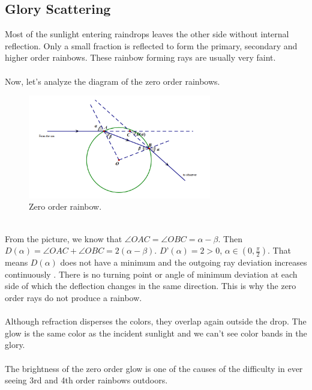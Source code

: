 \documentclass{article}
\begin{document}
\begin{spacing}{1.5}
\subsection{Glory Scattering}
Most of the sunlight entering raindrops leaves the other side without internal reflection. Only a small fraction is reflected to form the primary, secondary and higher order rainbows. These rainbow forming rays are usually very faint. \cite{Atoptics}\\
\\
Now, let’s analyze the diagram of the zero order rainbows.\\
\begin{figure}[!htb]
\centering
\includegraphics[width=8cm]{7.png}
\caption{Zero order rainbow.}
\end{figure}
\\
From the picture, we know that $\angle OAC=\angle OBC=\alpha-\beta$. Then $D(\alpha)= \angle OAC+\angle OBC=2(\alpha-\beta)$. $D’(\alpha)=2>0$, $\alpha\in(0,\frac{\pi}{2})$. That means $D(\alpha)$ does not have a minimum and the outgoing ray deviation increases continuously . There is no turning point or angle of minimum deviation at each side of which the deflection changes in the same direction. This is why the zero order rays do not produce a rainbow. \cite{Atoptics}\\
\\
Although refraction disperses the colors, they overlap again outside the drop. The glow is the same color as the incident sunlight and we can’t see color bands in the glory. \cite{Atoptics}\\
\\
The brightness of the zero order glow is one of the causes of the difficulty in ever seeing 3rd and 4th order rainbows outdoors. \cite{Atoptics}
\newpage

\end{spacing}
\end{document}

